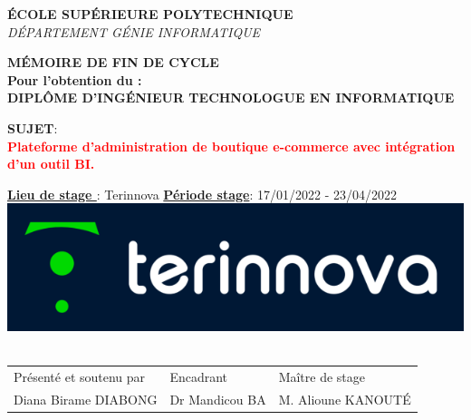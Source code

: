 \documentclass[a4paper, 12pt]{report}
\begin{document}
\begin{titlepage}
\textsc{\small \textbf{ÉCOLE SUPÉRIEURE POLYTECHNIQUE}}\\[0.15cm] %
\textsc{\small {\textit {DÉPARTEMENT GÉNIE INFORMATIQUE}}}\\[0.15cm] %

\begin{tcolorbox}[colback=white,colframe=myblue]
\centering
 \textcolor{myblue}{\small{\textbf{MÉMOIRE DE FIN DE CYCLE}}}\\
\small{\textbf{Pour l’obtention du :} \\
\textbf{DIPLÔME D'INGÉNIEUR TECHNOLOGUE EN INFORMATIQUE}} %
\end{tcolorbox}

\begin{tcolorbox}[colback=white,colframe=myblue]
\centering
\textbf{\small{SUJET}}: \\
\textcolor{red}{\textbf {Plateforme d'administration de boutique e-commerce avec intégration d'un outil BI.}} %
\end{tcolorbox}

 

\begin{tcolorbox}[colback=white,colframe=myblue]
\small{\textbf{\underline{Lieu de stage }}: \textcolor{myblue}{Terinnova} \quad \textbf{\underline{Période stage}}: \textcolor{myblue}{17/01/2022 - 23/04/2022}}\\
\centering \newline
\includegraphics[scale=.6]{img/terinnova.png}\ %
\end{tcolorbox}

\begin{tcolorbox}[colback=white,colframe=myblue]
\begin{tabular}{lll}
Présenté et soutenu par & Encadrant & Maître de stage\\
Diana Birame DIABONG & Dr Mandicou BA & M. Alioune KANOUTÉ
\end{tabular}
\end{tcolorbox}



\end{titlepage}
\end{document}
